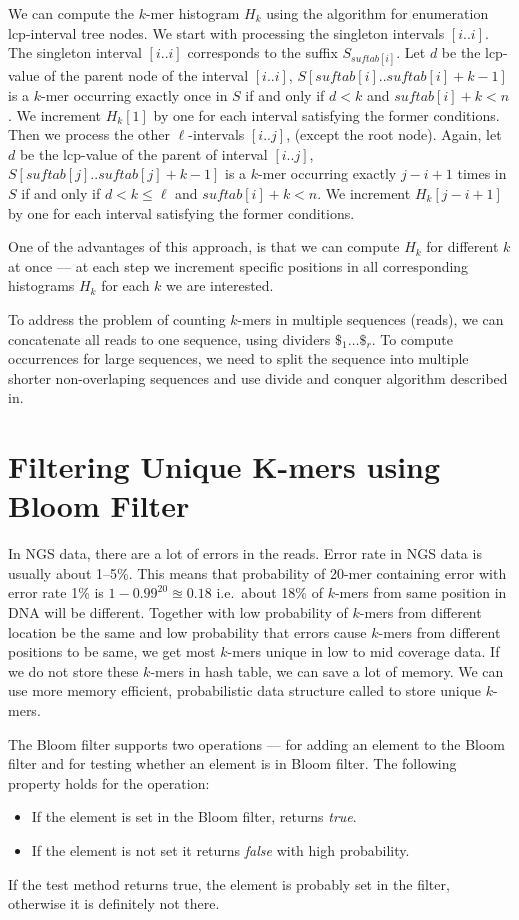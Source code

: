 We can compute the $k$-mer histogram $H_k$ using the algorithm for enumeration lcp-interval tree nodes. We start with processing the singleton intervals $[i..i]$. The singleton interval $[i..i]$ corresponds to the suffix $S_{suftab[i]}$. Let $d$ be the lcp-value of the parent node of the interval $[i..i]$, $S[suftab[i]..suftab[i]+k-1]$ is a $k$-mer occurring exactly once in $S$ if and only if $d < k$ and $suftab[i]+k < n$. We increment $H_k[1]$ by one for each interval satisfying the former conditions.
Then we process the other $\ell$-intervals $[i..j]$, (except the root node). Again, let $d$ be the lcp-value of the parent of interval $[i..j]$, $S[suftab[j]..suftab[j] + k - 1]$ is a $k$-mer occurring exactly $j - i + 1$ times in $S$ if and only if $d < k \leq \ell$ and $suftab[i]+k < n$. We increment $H_k[j-i+1]$ by one for each interval satisfying the former conditions.

One of the advantages of this approach, is that we can compute $H_k$ for different $k$ at once --- at each step we increment specific positions in all corresponding histograms $H_k$ for each $k$ we are interested.

To address the problem of counting $k$-mers in multiple sequences (reads), we can concatenate all reads to one sequence, using dividers $\$_1\dots \$_r$. To compute occurrences for large sequences, we need to split the sequence into multiple shorter non-overlaping sequences and use divide and conquer algorithm described in\cite{tallymer}.

\section{Filtering Unique K-mers using Bloom Filter}

In NGS data, there are a lot of errors in the reads. Error rate in NGS data is usually about 1--5\%. This means that probability of 20-mer containing error with error rate 1\% is $1 - 0.99^{20} \approxeq 0.18$ i.e.\ about 18\% of $k$-mers from same position in DNA will be different. Together with low probability of $k$-mers from different location be the same and low probability that errors cause $k$-mers from different positions to be same, we get most $k$-mers unique in low to mid coverage data. If we do not store these $k$-mers in hash table, we can save a lot of memory. We can use more memory efficient, probabilistic data structure called \cite{bloomfilter} to store unique $k$-mers.

The Bloom filter supports two operations ---  for adding an element to the Bloom filter and  for testing whether an element is in Bloom filter. The following property holds for the  operation:
\begin{itemize}
  \item If the element is set in the Bloom filter, returns \emph{true}.
  \item If the element is not set it returns \emph{false} with high probability.
\end{itemize}
If the test method returns true, the element is probably set in the filter, otherwise it is definitely not there.

